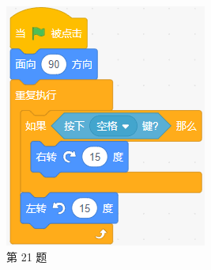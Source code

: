 \documentclass[10pt, a4paper]{article}
\begin{document}
\begin{enumerate}
        \begin{figure}[htbp]
            \centering
            \begin{minipage}[t]{.18\textwidth}
                \centering
                \includegraphics[width=\textwidth]{figure/21.png}
                \caption*{第 21 题}
            \end{minipage}
            \begin{minipage}[t]{.14\textwidth}

\end{minipage}
\end{figure}
\end{enumerate}
\end{document}
